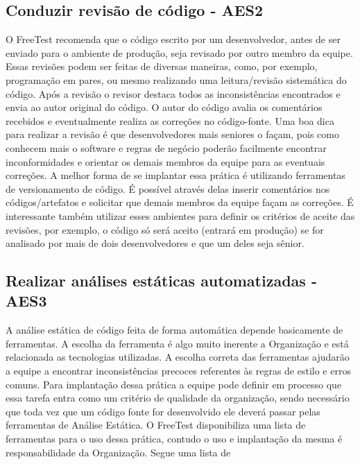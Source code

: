 \subsection{Conduzir revisão de código - AES2}
\label{sec:guiaaes2}

O FreeTest recomenda que o código escrito por um desenvolvedor, antes de ser enviado para o ambiente de produção, seja revisado por outro membro da equipe. Essas revisões podem ser feitas de diversas maneiras, como, por exemplo, programação em pares, ou mesmo realizando uma leitura/revisão sistemática do código. Após a revisão o revisor destaca todos as inconsistências encontrados e envia ao autor original do código. O autor do código avalia os comentários recebidos e eventualmente realiza as correções no código-fonte.
Uma boa dica para realizar a revisão é que desenvolvedores mais seniores o façam, pois como conhecem mais o software e regras de negócio poderão facilmente encontrar inconformidades e orientar os demais membros da equipe para as eventuais correções.
A melhor forma de se implantar essa prática é utilizando ferramentas de versionamento de código. É possível através delas inserir comentários nos códigos/artefatos e solicitar que demais membros da equipe façam as correções. É interessante também utilizar esses ambientes para definir os critérios de aceite das revisões, por exemplo, o código só será aceito (entrará em produção) se for analisado por mais de dois desenvolvedores e que um deles seja sênior.

\subsection{Realizar análises estáticas automatizadas - AES3}
\label{sec:guiaes3}

A análise estática de código feita de forma automática depende basicamente de ferramentas. A escolha da ferramenta é algo muito inerente a Organização e está relacionada as tecnologias utilizadas. A escolha correta das ferramentas ajudarão a equipe a encontrar inconsistências precoces referentes às regras de estilo e erros comuns.
Para implantação dessa prática a equipe pode definir em processo que essa tarefa entra como um critério de qualidade da organização, sendo necessário que toda vez que um código fonte for desenvolvido ele deverá passar pelas ferramentas de Análise Estática. O FreeTest disponibiliza uma lista de ferramentas para o uso dessa prática, contudo o uso e implantação da mesma é responsabilidade da Organização. Segue uma lista de

